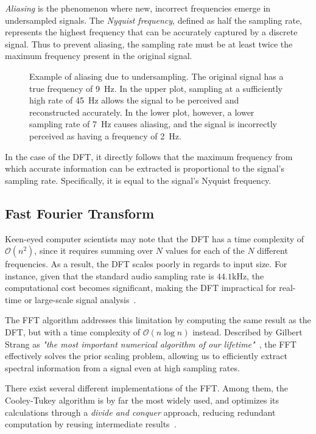 \textit{Aliasing} is the phenomenon where new, incorrect frequencies emerge in undersampled signals. The \textit{Nyquist frequency}, defined as half the sampling rate, represents the highest frequency that can be accurately captured by a discrete signal. Thus to prevent aliasing, the sampling rate must be at least twice the maximum frequency present in the original signal.

\begin{figure}[H]
    \centering
    
    \caption{Example of aliasing due to undersampling. The original signal has a true frequency of 9~Hz. In the upper plot, sampling at a sufficiently high rate of 45~Hz allows the signal to be perceived and reconstructed accurately. In the lower plot, however, a lower sampling rate of 7~Hz causes aliasing, and the signal is incorrectly perceived as having a frequency of 2~Hz.}
    \label{AliasingFigure}
\end{figure}

In the case of the \gls{DFT}, it directly follows that the maximum frequency from which accurate information can be extracted is proportional to the signal's sampling rate. Specifically, it is equal to the signal's Nyquist frequency.

\subsection{Fast Fourier Transform}

Keen-eyed computer scientists may note that the \gls{DFT} has a time complexity of $\mathcal{O}(n^2)$, since it requires summing over $N$ values for each of the $N$ different frequencies. As a result, the \gls{DFT} scales poorly in regards to input size. For instance, given that the standard audio sampling rate is $44.1 \text{kHz}$, the computational cost becomes significant, making the \gls{DFT} impractical for real-time or large-scale signal analysis~\cite{pras2010sampling}.

The \gls{FFT} algorithm addresses this limitation by computing the same result as the \gls{DFT}, but with a time complexity of $\mathcal{O}(n\log{n})$ instead. Described by Gilbert Strang as \textit{"the most important numerical algorithm of our lifetime"}~\cite{strang1993wavelet}, the \gls{FFT} effectively solves the prior scaling problem, allowing us to efficiently extract spectral information from a signal even at high sampling rates.

There exist several different implementations of the \gls{FFT}. Among them, the Cooley-Tukey algorithm is by far the most widely used, and optimizes its calculations through a \textit{divide and conquer} approach, reducing redundant computation by reusing intermediate results~\cite{d3ea2d52-5ab2-3128-8b80-efb85267295d}.

